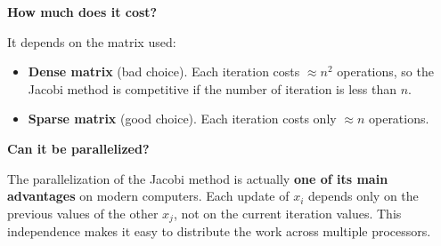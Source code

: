 \highspace
\begin{flushleft}
    \textcolor{Red2}{ \textbf{How much does it cost?}}
    \label{general-ref: cost jacobi method}
\end{flushleft}
It depends on the matrix used:
\begin{itemize}
    \item \textbf{Dense matrix} (bad choice). Each iteration costs $\approx n^{2}$ operations, so the Jacobi method is competitive if the number of iteration is less than $n$.
    \item \textbf{Sparse matrix} (good choice). Each iteration costs only $\approx n$ operations.
\end{itemize}

\highspace
\begin{flushleft}
    \textcolor{Green3}{ \textbf{Can it be parallelized?}}
\end{flushleft}
The parallelization of the Jacobi method is actually \textbf{one of its main advantages} on modern computers. Each update of $x_{i}$ depends only on the previous values of the other $x_{j}$, not on the current iteration values. This independence makes it easy to distribute the work across multiple processors.
